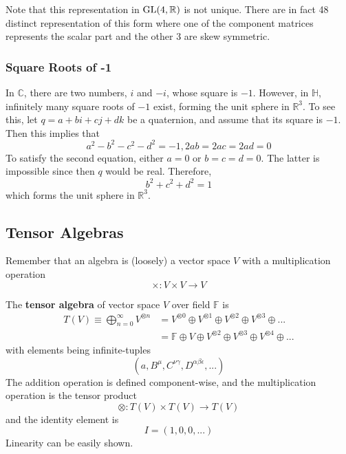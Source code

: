     Note that this representation in $\operatorname{GL}(4, \mathbb{R})$ is not unique. There are in fact 48 distinct representation of this form where one of the component matrices represents the scalar part and the other 3 are skew symmetric. 

  \subsubsection{Square Roots of -1}

    In $\mathbb{C}$, there are two numbers, $i$ and $-i$, whose square is $-1$. However, in $\mathbb{H}$, infinitely many square roots of $-1$ exist, forming the unit sphere in $\mathbb{R}^3$. To see this, let $q = a+bi+cj+dk$ be a quaternion, and assume that its square is $-1$. Then this implies that
    \begin{equation}
      a^2 - b^2 -c^2 -d^2 = -1, 2ab = 2ac = 2ad = 0
    \end{equation}
    To satisfy the second equation, either $a=0$ or $b=c=d=0$. The latter is impossible since then $q$ would be real. Therefore, 
    \begin{equation}
      b^2 + c^2 + d^2 = 1
    \end{equation}
    which forms the unit sphere in $\mathbb{R}^3$. 

\subsection{Tensor Algebras}

  Remember that an algebra is (loosely) a vector space $V$ with a multiplication operation
  \begin{equation}
    \times: V \times V \longrightarrow V
  \end{equation}

  \begin{definition}
    The \textbf{tensor algebra} of vector space $V$ over field $\mathbb{F}$ is 
    \begin{align*}
      T(V) \equiv \bigoplus_{n = 0}^{\infty} V^{\otimes n} & = V^{\otimes 0} \oplus V^{\otimes 1} \oplus V^{\otimes 2} \oplus V^{\otimes 3} \oplus ... \\
      & = \mathbb{F} \oplus V \oplus V^{\otimes 2} \oplus V^{\otimes 3} \oplus V^{\otimes 4} \oplus ...
    \end{align*}
    with elements being infinite-tuples
    \begin{equation}
      (a, B^\mu, C^{\nu \gamma}, D^{\alpha \beta \epsilon}, ...)
    \end{equation}
    The addition operation is defined component-wise, and the multiplication operation is the tensor product 
    \begin{equation}
      \otimes: T(V) \times T(V) \longrightarrow T(V)
    \end{equation}
    and the identity element is
    \begin{equation}
      I = (1, 0, 0, ...)
    \end{equation}
    Linearity can be easily shown. 
  \end{definition}

